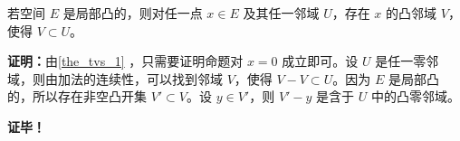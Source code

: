 \begin{theorem}{}
若空间 $E$ 是局部凸的，则对任一点 $x\in E$ 及其任一邻域 $U$，存在 $x$ 的凸邻域 $V$，使得 $V\subset U$。
\end{theorem}

\textbf{证明：}由\autoref{the_tvs_1} ，只需要证明命题对 $x=0$ 成立即可。设 $U$ 是任一零邻域，则由加法的连续性，可以找到邻域 $V$，使得 $V-V\subset U$。因为 $E$ 是局部凸的，所以存在非空凸开集 $V'\subset V$。设 $y\in V'$，则 $V'-y$ 是含于 $U$ 中的凸零邻域。


\textbf{证毕！}









